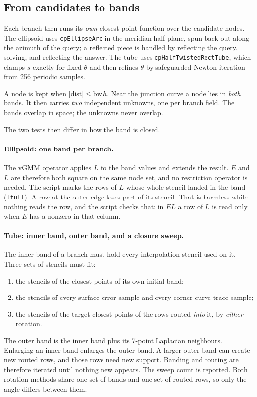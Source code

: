\subsection{From candidates to bands}

Each branch then runs its \emph{own} closest point function over the
candidate nodes. The ellipsoid uses \texttt{cpEllipseArc} in the meridian
half plane, spun back out along the azimuth of the query; a reflected
piece is handled by reflecting the query, solving, and reflecting the
answer. The tube uses \texttt{cpHalfTwistedRectTube}, which clamps $s$
exactly for fixed $\theta$ and then refines $\theta$ by safeguarded
Newton iteration from 256 periodic samples.

A node is kept when $|\mathrm{dist}| \le \mathrm{bw}\,h$. Near the
junction curve a node lies in \emph{both} bands. It then carries
\emph{two} independent unknowns, one per branch field. The bands overlap
in space; the unknowns never overlap.

The two tests then differ in how the band is closed.

\paragraph{Ellipsoid: one band per branch.} The vGMM operator applies $L$
to the band values and extends the result. $E$ and $L$ are therefore both
square on the same node set, and no restriction operator is needed. The
script marks the rows of $L$ whose whole stencil landed in the band
(\texttt{lfull}). A row at the outer edge loses part of its stencil. That
is harmless while nothing reads the row, and the script checks that: in
$EL$ a row of $L$ is read only when $E$ has a nonzero in that column.

\paragraph{Tube: inner band, outer band, and a closure sweep.} The inner
band of a branch must hold every interpolation stencil used on it. Three
sets of stencils must fit:
\begin{enumerate}
  \item the stencils of the closest points of its own initial band;
  \item the stencils of every surface error sample and every
        corner-curve trace sample;
  \item the stencils of the target closest points of the rows routed
        \emph{into} it, by \emph{either} rotation.
\end{enumerate}
The outer band is the inner band plus its 7-point Laplacian neighbours.
Enlarging an inner band enlarges the outer band. A larger outer band can
create new routed rows, and those rows need new support. Banding and
routing are therefore iterated until nothing new appears. The sweep count
is reported. Both rotation methods share one set of bands and one set of
routed rows, so only the angle differs between them.

